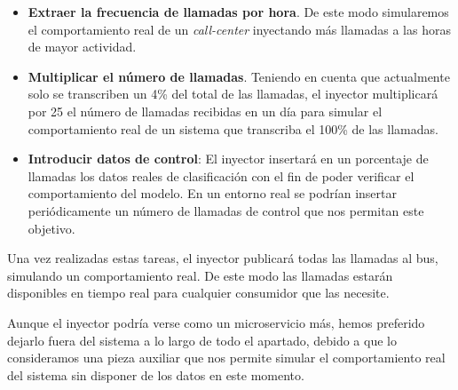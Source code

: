 \begin{itemize}
	\item \textbf{ Extraer la frecuencia de llamadas por hora}. De este modo simularemos el comportamiento real de un \textit{call-center} inyectando más llamadas a las horas de mayor actividad.
	\item \textbf{Multiplicar el número de llamadas}. Teniendo en cuenta que actualmente solo se transcriben un 4\% del total de las llamadas, el inyector multiplicará por 25 el número de llamadas recibidas en un día para simular el comportamiento real de un sistema que transcriba el 100\% de las llamadas.
	\item \textbf{Introducir datos de control}: El inyector insertará en un porcentaje de llamadas los datos reales de clasificación con el fin de poder verificar el comportamiento del modelo. En un entorno real se podrían insertar periódicamente un número de llamadas de control que nos permitan este objetivo.
	
\end{itemize}

Una vez realizadas estas tareas, el inyector publicará todas las llamadas al bus, simulando un comportamiento real. De este modo las llamadas estarán disponibles en tiempo real para cualquier consumidor que las necesite.

Aunque el inyector podría verse como un microservicio más, hemos preferido dejarlo fuera del sistema a lo largo de todo el apartado, debido a que lo consideramos una pieza auxiliar que nos permite simular el comportamiento real del sistema sin disponer de los datos en este momento.


